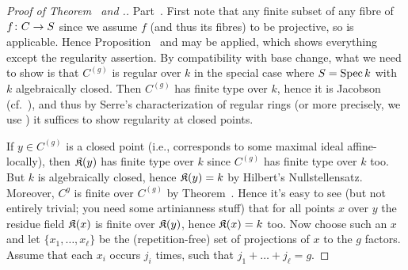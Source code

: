 \documentclass[a4paper,parskip=half,numbers=enddot, DIV=12]{scrreprt}
\begin{document}
\begin{proof}[Proof of Theorem~ and .]
	Part~. First note that any finite subset of any fibre of $f\colon C\morphism S$ since we assume $f$ (and thus its fibres) to be projective, so \cite[Proposition~2.2.1]{alggeo2} is applicable. Hence Proposition~ and  may be applied, which shows everything except the regularity assertion. By compatibility with base change, what we need to show is that $C^{(g)}$ is regular over $k$ in the special case where $S=\operatorname{Spec} k$ with $k$ algebraically closed. Then $C^{(g)}$ has finite type over $k$, hence it is Jacobson (cf.\ \cite[Definition~2.4.2]{alggeo1}), and thus by Serre's characterization of regular rings (or more precisely, we use \cite[Corollary~2.2.1]{homalg}) it suffices to show regularity at closed points.
	
	If $y\in C^{(g)}$ is a closed point (i.e., corresponds to some maximal ideal affine-locally), then $\mathfrak{K}(y)$ has finite type over $k$ since $C^{(g)}$ has finite type over $k$ too. But $k$ is algebraically closed, hence $\mathfrak{K}(y)=k$ by Hilbert's Nullstellensatz. Moreover, $C^g$ is finite over $C^{(g)}$ by Theorem~. Hence it's easy to see (but not entirely trivial; you need some artinianness stuff) that for all points $x$ over $y$ the residue field $\mathfrak{K}(x)$ is finite over $\mathfrak{K}(y)$, hence $\mathfrak{K}(x)=k$ too. Now choose such an $x$ and let $\{x_1,\ldots,x_\ell\}$ be the (repetition-free) set of projections of $x$ to the $g$ factors. Assume that each $x_i$ occurs $j_i$ times, such that $j_1+\ldots+j_\ell=g$.
	

\end{proof}
\end{document}
